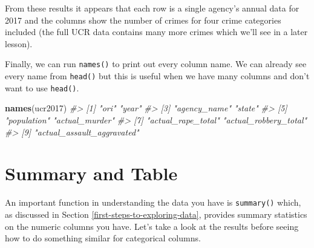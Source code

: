 \documentclass[
  12pt,
]{book}
\newenvironment{Shaded}{\begin{snugshade}}{\end{snugshade}}
\newcommand{\CommentTok}[1]{\textcolor[rgb]{0.37,0.37,0.37}{\textit{#1}}}
\newcommand{\KeywordTok}[1]{\textcolor[rgb]{0.27,0.27,0.27}{\textbf{#1}}}
\newcommand{\NormalTok}[1]{#1}
\begin{document}
From these results it appears that each row is a single agency's annual data for 2017 and the columns show the number of crimes for four crime categories included (the full UCR data contains many more crimes which we'll see in a later lesson).

Finally, we can run \texttt{names()} to print out every column name. We can already see every name from \texttt{head()} but this is useful when we have many columns and don't want to use \texttt{head()}.

\begin{Shaded}
\begin{Highlighting}[]
\KeywordTok{names}\NormalTok{(ucr2017)}
\CommentTok{\#> [1] "ori"                       "year"                     }
\CommentTok{\#> [3] "agency\_name"               "state"                    }
\CommentTok{\#> [5] "population"                "actual\_murder"            }
\CommentTok{\#> [7] "actual\_rape\_total"         "actual\_robbery\_total"     }
\CommentTok{\#> [9] "actual\_assault\_aggravated"}
\end{Highlighting}
\end{Shaded}

\hypertarget{summary-and-table}{%
\section{Summary and Table}\label{summary-and-table}}

An important function in understanding the data you have is \texttt{summary()} which, as discussed in Section \ref{first-steps-to-exploring-data}, provides summary statistics on the numeric columns you have. Let's take a look at the results before seeing how to do something similar for categorical columns.
\end{document}
